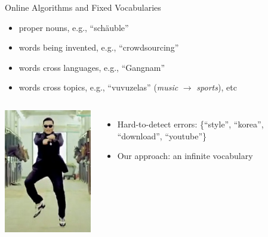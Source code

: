 \documentclass[compress]{beamer}
\begin{document}
\begin{frame}{Online Algorithms and Fixed Vocabularies}

\begin{block}{}
\begin{itemize}
\item proper nouns, e.g., ``sch\"{a}uble''
\item words being invented, e.g., ``crowdsourcing''
\item words cross languages, e.g., ``Gangnam''
\item words cross topics, e.g., ``vuvuzelas'' (\textit{music}
  $\rightarrow$ \textit{sports}), etc
\end{itemize}
\end{block}
\pause
\begin{columns}


\centering
\includegraphics[width=.5\linewidth]{infvoc/psy}



\begin{itemize}
  \item Hard-to-detect errors: \{``style'', ``korea'',
    ``download'', ``youtube''\}
\pause
      \item Our approach: an infinite vocabulary
\end{itemize}


\end{columns}

\end{frame}

\end{document}

